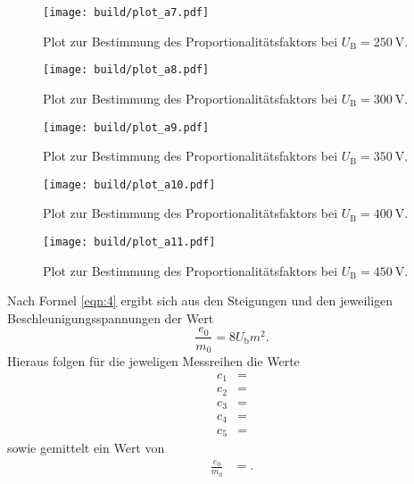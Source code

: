 \begin{figure}
  \centering
  \texttt{[image: build/plot\_a7.pdf]}
  \caption{Plot zur Bestimmung des Proportionalitätsfaktors bei $U_{\text{B}} = \SI{250}{\volt}$.}
  \label{plot:7}
\end{figure}

\begin{figure}
  \centering
  \texttt{[image: build/plot\_a8.pdf]}
  \caption{Plot zur Bestimmung des Proportionalitätsfaktors bei $U_{\text{B}} = \SI{300}{\volt}$.}
  \label{plot:8}
\end{figure}

\begin{figure}
  \centering
  \texttt{[image: build/plot\_a9.pdf]}
  \caption{Plot zur Bestimmung des Proportionalitätsfaktors bei $U_{\text{B}} = \SI{350}{\volt}$.}
  \label{plot:9}
\end{figure}

\begin{figure}
  \centering
  \texttt{[image: build/plot\_a10.pdf]}
  \caption{Plot zur Bestimmung des Proportionalitätsfaktors bei $U_{\text{B}} = \SI{400}{\volt}$.}
  \label{plot:10}
\end{figure}

\begin{figure}
  \centering
  \texttt{[image: build/plot\_a11.pdf]}
  \caption{Plot zur Bestimmung des Proportionalitätsfaktors bei $U_{\text{B}} = \SI{450}{\volt}$.}
  \label{plot:11}
\end{figure}

Nach Formel \eqref{eqn:4} ergibt sich aus den Steigungen und den jeweiligen Beschleunigungsspannungen der Wert
\begin{equation}
  \frac{e_0}{m_0} = 8 U_\text{b} m^2.
\end{equation}
Hieraus folgen für die jeweligen Messreihen die Werte
\begin{align*}
  c_1 &=  \\
  c_2 &=  \\
  c_3 &=  \\
  c_4 &=  \\
  c_5 &= 
\end{align*}
sowie gemittelt ein Wert von
\begin{align*}
  \frac{e_0}{m_0} &= . \\
\end{align*}

